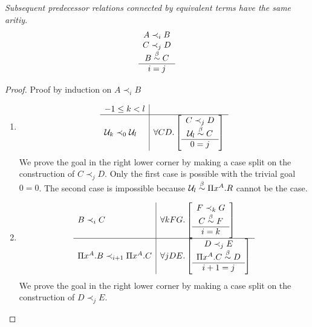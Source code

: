 \begin{lemma}
    \label{PrecedenceSameArity}
    \emph{Subsequent predecessor relations connected by equivalent terms have
    the same aritiy}.
    $$
    \begin{array}{c} 
        A \prec_i B
        \\
        C \prec_j D
        \\
        B \stackrel{\beta}{\sim} C
     \\ \hline 
        i = j
    \end{array}
    $$

    \begin{proof}
        Proof by induction on $A \prec_i B$
        \begin{enumerate}
        \item
            $$
            \begin{array}{l|l}
                -1 \le k < l
                \\
                \hline
                {\cal U}_k \prec_0 {\cal U}_l
                &
                \forall C D.
                \left[
                \begin{array}{c} 
                    C \prec_j D
                    \\
                    {\cal U}_l \stackrel{\beta}{\sim} C
                 \\ \hline 0 = j\end{array}
                \right]
            \end{array}
            $$
            We prove the goal in the right lower corner by making a case split
            on the construction of $C \prec_j D$. Only the first case
            is possible with the trivial goal $0 = 0$. The second case is
            impossible because ${\cal U}_l \stackrel{\beta}{\sim} \Pi x^A. R$ cannot be the case.

        \item
        $$
            \begin{array}{l|l}
                B \prec_i C
                &
                \forall k F G.
                \left[
                \begin{array}{c} F \prec_k G \\ C \stackrel{\beta}{\sim} F \\ \hline i = k\end{array}
                \right]
                \\
                \hline
                \Pi x^A.B \prec_{i+1} \Pi x^A. C
                &
                \forall j D E.
                \left[
                \begin{array}{c} 
                    D \prec_j E
                    \\
                    \Pi x^A. C \stackrel{\beta}{\sim} D
                 \\ \hline i+1 = j\end{array}
                \right]
            \end{array}
        $$
        We prove the goal in the right lower corner by making a case split on
        the construction of $D \prec_j E$.


\end{enumerate}
\end{proof}
\end{lemma}
